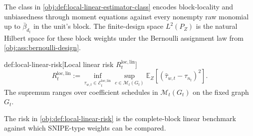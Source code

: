 The class in \cref{obj:def:local-linear-estimator-class} encodes block-locality and unbiasedness through moment equations against every nonempty raw monomial up to \(\bar\beta_{d_t}\) in the unit's block. The finite-design space \(L^2(P_Z)\) is the natural Hilbert space for these block weights under the Bernoulli assignment law from \cref{obj:ass:bernoulli-design}.

\begin{definitionv}{def:local-linear-risk}[Local linear risk $R_t^{\mathrm{loc,lin}}$]
\[
R_t^{\mathrm{loc,lin}}
:=
\inf_{\widehat\tau_{w,t}\in\mathcal E_t^{\mathrm{loc,lin}}}
\sup_{c\in\mathcal M_t(G_t)}
\mathbb E_Z\!\left[
\left(\widehat\tau_{w,t}-\tau_{n_t}\right)^2
\right].
\]
The supremum ranges over coefficient schedules in \(\mathcal M_t(G_t)\) on the fixed graph \(G_t\).
\end{definitionv}

The risk in \cref{obj:def:local-linear-risk} is the complete-block linear benchmark against which SNIPE-type weights can be compared.

